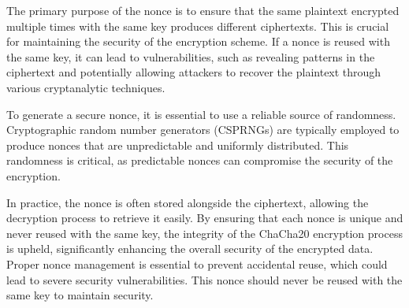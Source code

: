 \documentclass[a4paper,12pt]{report}
\begin{document}
\begin{enumerate}
    The primary purpose of the nonce is to ensure that the same plaintext encrypted multiple times with the same key produces different ciphertexts.
    This is crucial for maintaining the security of the encryption scheme.
    If a nonce is reused with the same key, it can lead to vulnerabilities, such as revealing patterns in the ciphertext and potentially allowing attackers to recover the plaintext through various cryptanalytic techniques.

    To generate a secure nonce, it is essential to use a reliable source of randomness.
    Cryptographic random number generators (CSPRNGs) are typically employed to produce nonces that are unpredictable and uniformly distributed.
    This randomness is critical, as predictable nonces can compromise the security of the encryption.

    In practice, the nonce is often stored alongside the ciphertext, allowing the decryption process to retrieve it easily.
    By ensuring that each nonce is unique and never reused with the same key, the integrity of the ChaCha20 encryption process is upheld, significantly enhancing the overall security of the encrypted data.
    Proper nonce management is essential to prevent accidental reuse, which could lead to severe security vulnerabilities.
   This nonce should never be reused with the same key to maintain security.
\end{enumerate}
\end{document}

